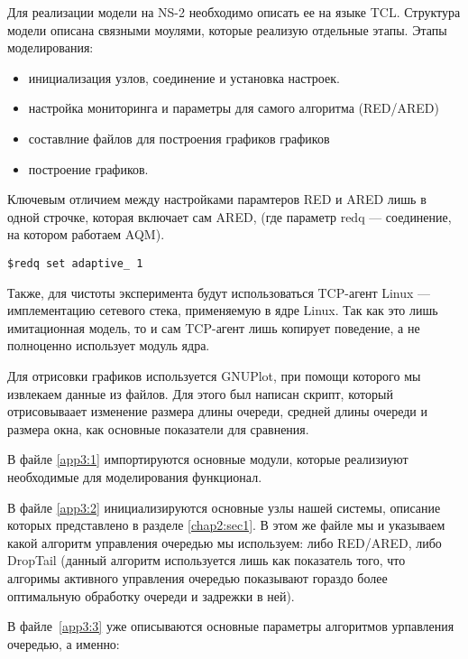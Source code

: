 Для реализации модели на NS-2 необходимо описать ее на языке TCL. Структура
модели описана связными моулями, которые реализую отдельные этапы. Этапы
моделирования:

\begin{itemize}
        \item инициализация узлов, соединение и установка настроек.
        \item настройка мониторинга и параметры для самого алгоритма (RED/ARED)
        \item составлние файлов для построения графиков графиков
        \item построение графиков.
\end{itemize}

Ключевым отличием между настройками парамтеров RED и ARED лишь в одной строчке,
которая включает сам ARED, (где параметр redq --- соединение, на котором
работаем AQM).

\begin{verbatim}
$redq set adaptive_ 1
\end{verbatim}

Также, для чистоты эксперимента будут использоваться TCP-агент Linux ---
имплементацию сетевого стека, применяемую в ядре Linux. Так как это лишь
имитационная модель, то и сам TCP-агент лишь копирует поведение, а не
полноценно использует модуль ядра.

Для отрисовки графиков используется GNUPlot, при помощи которого мы извлекаем
данные из файлов. Для этого был написан скрипт, который отрисовываает изменение
размера длины очереди, средней длины очереди и размера окна, как основные
показатели для сравнения.

В файле \ref{app3:1} импортируются основные модули, которые реализиуют
необходимые для моделирования функционал.

В файле \ref{app3:2} инициализируются основные узлы нашей системы, описание
которых представлено в разделе \ref{chap2:sec1}. В этом же файле мы и указываем
какой алгоритм управления очередью мы используем: либо RED/ARED, либо DropTail
(данный алгоритм используется лишь как показатель того, что алгоримы активного
управления очередью показывают гораздо более оптимальную обработку очереди и
задрежки в ней). 

В файле~\ref{app3:3} уже описываются основные параметры алгоритмов урпавления
очередью, а именно:

